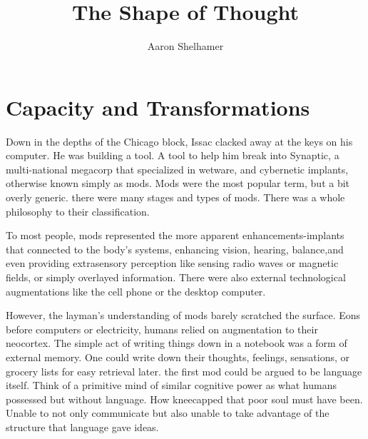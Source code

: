 \documentclass[a4paper,twoside,fontsize=12pt,pagesize=auto]{scrbook}
\begin{document}
\title{The Shape of Thought}
\author{Aaron Shelhamer}
\frontmatter
\maketitle
\mainmatter
\chapter{Capacity and Transformations}


Down in the depths of the Chicago block, Issac clacked away at the keys on his computer. He was building a tool. A tool to help him break into Synaptic, a multi\hyp{}national megacorp that specialized in wetware, and cybernetic implants, otherwise known simply as mods. Mods were the most popular term, but a bit overly generic. there were many stages and types of mods. There was a whole philosophy to their classification.

To most people, mods represented the more apparent enhancements\hyp{}implants that connected to the body's systems, enhancing vision, hearing, balance,and even providing extrasensory perception like sensing radio waves or magnetic fields, or simply overlayed information. There were also external technological augmentations like the cell phone or the desktop computer.

However, the layman's understanding of mods barely scratched the surface. Eons before computers or electricity, humans relied on augmentation to their neocortex. The simple act of writing things down in a notebook was a form of external memory. One could write down their thoughts, feelings, sensations, or grocery lists for easy retrieval later. the first mod could be argued to be language itself. Think of a primitive mind of similar cognitive power as what humans possessed but without language. How kneecapped that poor soul must have been. Unable to not only communicate but also unable to take advantage of the structure that language gave ideas.
    
\end{document}
